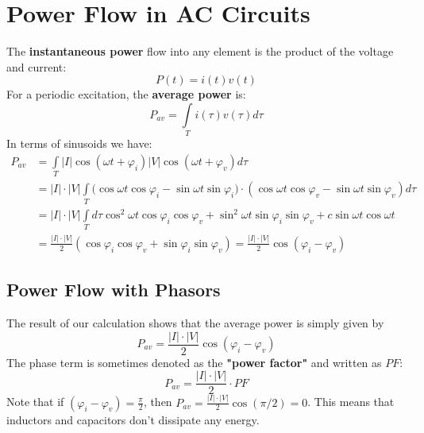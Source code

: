 \section{Power Flow in AC Circuits}
 The \textbf{instantaneous power} flow into any element is the product of the voltage and current:
    \begin{equation} 
        P(t) = i(t)v(t)
    \end{equation}
For a periodic excitation, the \textbf{average power} is:
    \begin{equation} 
        {P_{av}} = \int\limits_T {i(\tau)v(\tau)d\tau} 
    \end{equation}
In terms of sinusoids we have:
    \begin{align*}
        {P_{av}} &= \int\limits_T {\left| I \right|\cos (\omega t + {\varphi _i})\left| V \right|\cos (\omega t + {\varphi _v})d\tau }\\
        &= \left| I \right| \cdot \left| V \right|\int\limits_T {(\cos \omega t\cos {\varphi _i} - \sin \omega t\sin {\varphi _i}} ) \cdot (\cos \omega t\cos {\varphi _v} - \sin \omega t\sin {\varphi _v})d\tau\\
        &= \left| I \right| \cdot \left| V \right|\int\limits_T {d\tau {{\cos }^2}\omega t\cos {\varphi _i}\cos {\varphi _v} + {{\sin }^2}\omega t\sin {\varphi _i}\sin {\varphi _v} + c\sin \omega t\cos \omega t}\\
        &= \frac{{\left| I \right| \cdot \left| V \right|}}{2}(\cos {\varphi _i}\cos {\varphi _v} + \sin {\varphi _i}\sin {\varphi _v}) = \frac{{\left| I \right| \cdot \left| V \right|}}{2}\cos ({\varphi _i} - {\varphi _v})
    \end{align*}
\newpage
\subsection{Power Flow with Phasors}
The result of our calculation shows that the average power is simply given by
    \begin{equation}
        {P_{av}} = \frac{{\left| I \right| \cdot \left| V \right|}}{2}\cos ({\varphi _i} - {\varphi _v})
    \end{equation}
The phase term is sometimes denoted as the \textbf{"power factor"} and written as $PF$:
    \begin{equation} 
        {P_{av}} = \frac{{\left| I \right| \cdot \left| V \right|}}{2} \cdot PF
    \end{equation}
Note that if $({\varphi _i} - {\varphi _v}) = \frac{\pi }{2}$, then ${P_{av}} = \frac{{\left| I \right| \cdot \left| V \right|}}{2}\cos (\pi /2) = 0$.  This means that inductors and capacitors don't dissipate any energy.

